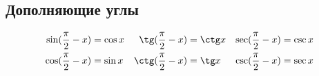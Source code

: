 \subsection*{Дополняющие углы}

\begin{align*}
  \sin(\frac{\pi}{2} - x) &= \cos x & \tg(\frac{\pi}{2} - x) &= \ctg x & \sec(\frac{\pi}{2} - x) &= \csc x\\
  \cos(\frac{\pi}{2} - x) &= \sin x & \ctg(\frac{\pi}{2} - x) &= \tg x & \csc(\frac{\pi}{2} - x) &= \sec x
\end{align*}

\hrulefill